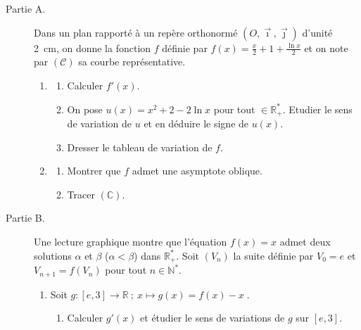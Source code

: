 \begin{exo}
      \begin{description}
            \item[Partie A.]
                  Dans un plan rapport\'e \`a un rep\`ere orthonorm\'e $(O,\vec{\imath},\vec{\jmath})$ d'unit\'e 2~cm,
                  on donne la fonction $f$ d\'efinie par $f(x) = \frac{x}{2} + 1 + \frac{\ln x}{2}$ et 
                  on note par $(\mathcal{C})$ sa courbe repr\'esentative.
                  \begin{enumerate}
                        \item \begin{enumerate}
                                    \item Calculer $f'(x)$.
                                    \item On pose $u(x) = x^2 + 2 - 2 \ln x$ pour tout $ \in \mathbb{R}^*_+$. 
                                          Etudier le sens de variation de $u$ et en d\'eduire le signe de $u(x)$.
                                    \item Dresser le tableau de variation de $f$.
                              \end{enumerate}
                        \item \begin{enumerate}
                                    \item Montrer que $f$ admet une asymptote oblique.
                                    \item Tracer $(\mathbb{C})$.
                              \end{enumerate}
                  \end{enumerate}
            \item[Partie B.]
                  Une lecture graphique montre que l'\'equation $f(x) = x$ admet 
                  deux solutions $\alpha $ et $\beta$ ($\alpha < \beta$) dans $\mathbb{R}^*_+$.
                  Soit $(V_n)$ la suite d\'efinie par $V_0 = e$ et $V_{n + 1} = f(V_n)$ pour tout $n \in \mathbb{N}^*$.
                  \begin{enumerate}
                        \item Soit $g : [e , 3] \rightarrow \mathbb{R} \ ;\ x \mapsto g(x) = f(x) - x \; . $
                              \begin{enumerate}
                                    \item Calculer $g'(x) $ et \'etudier le sens de variations de $g$ sur $[e,3]$.

\end{enumerate}
\end{enumerate}
\end{description}
\end{exo}
